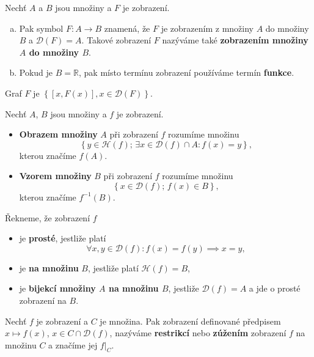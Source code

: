\begin{oznaceni}
    Nechť $A$ a $B$ jsou množiny a $F$ je zobrazení.
    \begin{enumerate}[(a)]
	\item Pak symbol $F:A\to B$ znamená, že $F$ je zobrazením z množiny $A$ do množiny $B$
	a $\mathcal D(F) = A$. Takové zobrazení $F$ nazýváme také \textbf{zobrazením množiny $A$ do množiny $B$}.
	\item Pokud je $B=\mathbb R $, pak  místo termínu zobrazení používáme termín \textbf{funkce}.
    \end{enumerate}
\end{oznaceni}

\begin{poznamka}
	Graf $F$ je $\left \{ \left [ x,F(x) \right ] ,x\in \mathcal D(F) \right \} $.
\end{poznamka}

\begin{definice}
	Nechť $A$, $B$ jsou množiny a $f$ je zobrazení.
	\begin{itemize}
		\item \textbf{Obrazem množiny} $A$ při zobrazení $f$ rozumíme množinu
		$$
  \left \{ y\in \mathcal H(f);\, \exists x \in \mathcal D(f) \cap A: f(x)=y \right \},
		$$
		kterou značíme $f(A)$.
		\item \textbf{Vzorem množiny} $B$ při zobrazení $f$ rozumíme množinu
		$$
		\left \{ x\in \mathcal D(f); \, f(x) \in B \right \},
		$$
		kterou značíme $f^{-1}(B)$.
\end{itemize}
\end{definice}

\begin{definice}
	Řekneme, že zobrazení $f$
	\begin{itemize}
		\item je \textbf{prosté}, jestliže platí
		$$
		    \forall x,y \in \mathcal D(f): f(x)=f(y)\implies x=y,
		$$
		\item je \textbf{na množinu} $B$, jestliže platí $\mathcal H(f)=B$,
		\item je \textbf{bijekcí množiny $A$ na množinu $B$}, jestliže $\mathcal D(f) = A$ a jde o prosté zobrazení na $B$.
\end{itemize}
\end{definice}

\begin{definice}
	Nechť $f$ je zobrazení a $C$ je množina. Pak zobrazení definované předpisem $x\mapsto f(x)$, $x \in C\cap \mathcal D(f)$, nazýváme
	\textbf{restrikcí} nebo \textbf{zúžením} zobrazení $f$ na množinu $C$ a značíme jej $f|_C$.
\end{definice}


